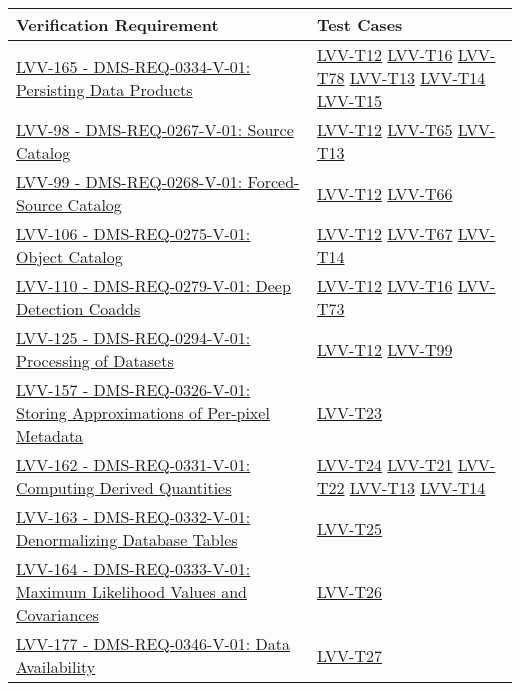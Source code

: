 \scriptsize{
\begin{longtable}[]{p{13cm}p{3cm}}
\toprule
Verification Requirement & Test Cases\tabularnewline
\midrule
\endhead

\href{https://jira.lsstcorp.org/browse/LVV-165}{LVV-165 - DMS-REQ-0334-V-01: Persisting Data Products}
& {
\hyperref[lvv-t12]{LVV-T12}
\hyperref[lvv-t16]{LVV-T16}
\hyperref[lvv-t78]{LVV-T78}
\hyperref[lvv-t13]{LVV-T13}
\hyperref[lvv-t14]{LVV-T14}
\hyperref[lvv-t15]{LVV-T15}
} \\
\href{https://jira.lsstcorp.org/browse/LVV-98}{LVV-98 - DMS-REQ-0267-V-01: Source Catalog}
& {
\hyperref[lvv-t12]{LVV-T12}
\hyperref[lvv-t65]{LVV-T65}
\hyperref[lvv-t13]{LVV-T13}
} \\
\href{https://jira.lsstcorp.org/browse/LVV-99}{LVV-99 - DMS-REQ-0268-V-01: Forced-Source Catalog}
& {
\hyperref[lvv-t12]{LVV-T12}
\hyperref[lvv-t66]{LVV-T66}
} \\
\href{https://jira.lsstcorp.org/browse/LVV-106}{LVV-106 - DMS-REQ-0275-V-01: Object Catalog}
& {
\hyperref[lvv-t12]{LVV-T12}
\hyperref[lvv-t67]{LVV-T67}
\hyperref[lvv-t14]{LVV-T14}
} \\
\href{https://jira.lsstcorp.org/browse/LVV-110}{LVV-110 - DMS-REQ-0279-V-01: Deep Detection Coadds}
& {
\hyperref[lvv-t12]{LVV-T12}
\hyperref[lvv-t16]{LVV-T16}
\hyperref[lvv-t73]{LVV-T73}
} \\
\href{https://jira.lsstcorp.org/browse/LVV-125}{LVV-125 - DMS-REQ-0294-V-01: Processing of Datasets}
& {
\hyperref[lvv-t12]{LVV-T12}
\hyperref[lvv-t99]{LVV-T99}
} \\
\href{https://jira.lsstcorp.org/browse/LVV-157}{LVV-157 - DMS-REQ-0326-V-01: Storing Approximations of Per-pixel Metadata}
& {
\hyperref[lvv-t23]{LVV-T23}
} \\
\href{https://jira.lsstcorp.org/browse/LVV-162}{LVV-162 - DMS-REQ-0331-V-01: Computing Derived Quantities}
& {
\hyperref[lvv-t24]{LVV-T24}
\hyperref[lvv-t21]{LVV-T21}
\hyperref[lvv-t22]{LVV-T22}
\hyperref[lvv-t13]{LVV-T13}
\hyperref[lvv-t14]{LVV-T14}
} \\
\href{https://jira.lsstcorp.org/browse/LVV-163}{LVV-163 - DMS-REQ-0332-V-01: Denormalizing Database Tables}
& {
\hyperref[lvv-t25]{LVV-T25}
} \\
\href{https://jira.lsstcorp.org/browse/LVV-164}{LVV-164 - DMS-REQ-0333-V-01: Maximum Likelihood Values and Covariances}
& {
\hyperref[lvv-t26]{LVV-T26}
} \\
\href{https://jira.lsstcorp.org/browse/LVV-177}{LVV-177 - DMS-REQ-0346-V-01: Data Availability}
& {
\hyperref[lvv-t27]{LVV-T27}
}
\end{longtable}}
